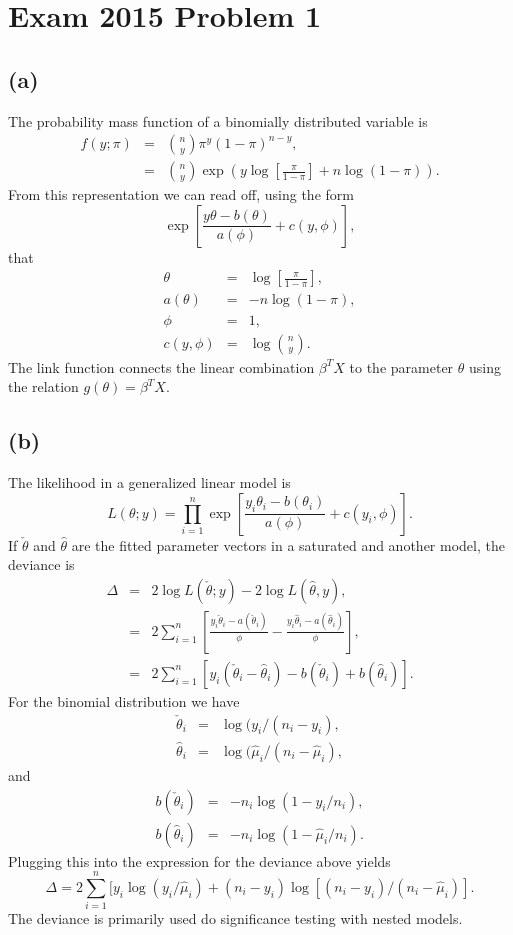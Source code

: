 \section*{Exam 2015 Problem 1}
\subsection*{(a)}
The probability mass function of a binomially distributed variable
is
\begin{eqnarray*}
f(y;\pi) & = & \binom{n}{y}\pi^{y}(1-\pi)^{n-y},\\
 & = & {\binom{n}{y}}\exp\left(y\log\left[\frac{\pi}{1-\pi}\right]+n\log(1-\pi)\right).
\end{eqnarray*}
From this representation we can read off, using the form
\[
\exp\left[\frac{y\theta-b(\theta)}{a(\phi)}+c(y,\phi)\right],
\]
that
\begin{eqnarray*}
\theta & = & \log\left[\frac{\pi}{1-\pi}\right],\\
a(\theta) & = & -n\log(1-\pi),\\
\phi & = & 1,\\
c(y,\phi) & = & \log{\binom{n}{y}}.
\end{eqnarray*}
The link function connects the linear combination $\beta^{T}X$ to
the parameter $\theta$ using the relation $g(\theta)=\beta^{T}X$.

\subsection*{(b)}
The likelihood in a generalized linear model is
\[
L(\theta;y)=\prod_{i=1}^{n}\exp\left[\frac{y_{i}\theta_{i}-b(\theta_{i})}{a(\phi)}+c(y_{i},\phi)\right].
\]
If $\check{\theta}$ and $\hat{\theta}$ are the fitted parameter
vectors in a saturated and another model, the deviance is
\begin{eqnarray*}
\Delta & = & 2\log L(\check{\theta};y)-2\log L(\hat{\theta},y),\\
 & = & 2\sum_{i=1}^{n}\left[\frac{y_{i}\check{\theta}_{i}-a(\check{\theta}_{i})}{\phi}-\frac{y_{i}\hat{\theta}_{i}-a(\hat{\theta}_{i})}{\phi}\right],\\
 & = & 2\sum_{i=1}^{n}\left[y_{i}(\check{\theta}_{i}-\hat{\theta}_{i})-b(\check{\theta}_{i})+b(\hat{\theta}_{i})\right].
\end{eqnarray*}
For the binomial distribution we have
\begin{eqnarray*}
\check{\theta}_{i} & = & \log(y_{i}/(n_{i}-y_{i}),\\
\hat{\theta}_{i} & = & \log(\hat{\mu}_{i}/(n_{i}-\hat{\mu}_{i}),
\end{eqnarray*}
and 
\begin{eqnarray*}
b(\check{\theta}_{i}) & = & -n_{i}\log(1-y_{i}/n_{i}),\\
b(\hat{\theta}_{i}) & = & -n_{i}\log(1-\hat{\mu}_{i}/n_{i}).
\end{eqnarray*}
Plugging this into the expression for the deviance above yields
\[
\Delta=2\sum_{i=1}^{n}[y_{i}\log(y_{i}/\hat{\mu}_{i})+(n_{i}-y_{i})\log[(n_{i}-y_{i})/(n_{i}-\hat{\mu}_{i})].
\]
The deviance is primarily used do significance testing with nested
models.
